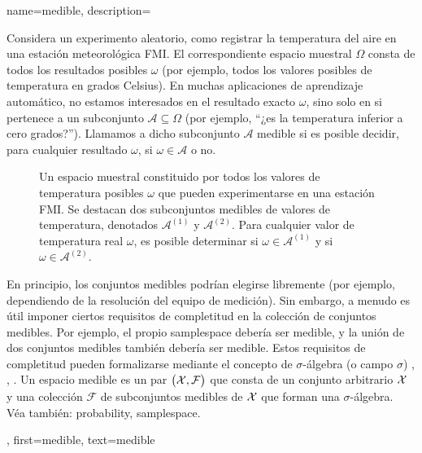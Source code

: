 {name={medible}, 
	description={
		Considera un experimento aleatorio, como registrar la temperatura del aire en una estación meteorológica FMI. 
		El correspondiente espacio muestral $\Omega$ consta de todos los resultados posibles $\omega$ (por ejemplo, 
		todos los valores posibles de temperatura en grados Celsius). En muchas aplicaciones de aprendizaje automático, no estamos interesados 
		en el resultado exacto $\omega$, sino solo en si pertenece a un subconjunto $\mathcal{A} \subseteq \Omega$ 
		(por ejemplo, “¿es la temperatura inferior a cero grados?”). Llamamos a dicho subconjunto $\mathcal{A}$ medible si es 
		posible decidir, para cualquier resultado $\omega$, si $\omega \in \mathcal{A}$ o no. 
		\begin{figure}[H]
			\vspace*{10mm}
		\caption{Un espacio muestral constituido por todos los valores de temperatura posibles $\omega$ 
			que pueden experimentarse en una estación FMI. Se destacan dos subconjuntos medibles de valores de temperatura, 
			denotados $\mathcal{A}^{(1)}$ y $\mathcal{A}^{(2)}$. Para cualquier 
			valor de temperatura real $\omega$, es posible determinar si $\omega \in \mathcal{A}^{(1)}$ y si $\omega \in \mathcal{A}^{(2)}$.
			} 
		\end{figure}
		En principio, los conjuntos medibles podrían elegirse libremente (por ejemplo, dependiendo de la resolución del 
		equipo de medición). Sin embargo, a menudo es útil imponer ciertos requisitos de completitud 
		en la colección de conjuntos medibles. Por ejemplo, el propio \gls{samplespace} debería ser 
		medible, y la unión de dos conjuntos medibles también debería ser medible. Estos requisitos de completitud 
		pueden formalizarse mediante el concepto de $\sigma$-álgebra (o campo $\sigma$) \cite{RudinBook}, \cite{BillingsleyProbMeasure}, \cite{durrett2010probability}. 
		Un espacio medible es un par $\big(\mathcal{X},\mathcal{F}\big)$ que consta de un conjunto arbitrario $\mathcal{X}$ y una 
		colección $\mathcal{F}$ de subconjuntos medibles de $\mathcal{X}$ que forman una $\sigma$-álgebra. 
	\\
		Véa también: \gls{probability}, \gls{samplespace}.},
	first={medible},
	text={medible} 
}



